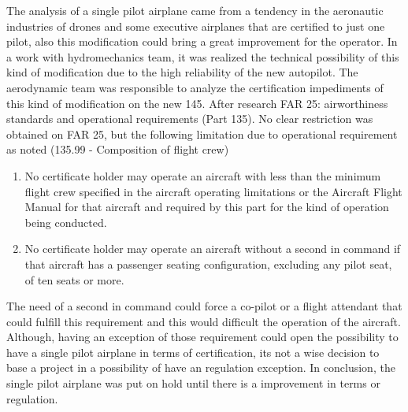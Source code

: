﻿The analysis of a single pilot airplane came from a tendency in the aeronautic industries of drones and some executive airplanes that are certified to just one pilot, also this modification could bring a great improvement for the operator.
	In a work with hydromechanics team, it was realized the technical possibility of this kind of modification due to the high reliability of the new autopilot. The aerodynamic team was responsible to analyze the certification impediments of this kind of modification on the new 145.
	After research FAR 25: airworthiness standards and operational requirements (Part 135). No clear restriction was obtained on FAR 25, but the following limitation due to operational requirement as noted (135.99 - Composition of flight crew)


\begin{enumerate}
  \item No certificate holder may operate an aircraft with less than the minimum flight crew specified in the aircraft operating limitations or the Aircraft Flight Manual for that aircraft and required by this part for the kind of operation being conducted.
  \item No certificate holder may operate an aircraft without a second in command if that aircraft has a passenger seating configuration, excluding any pilot seat, of ten seats or more.
\end{enumerate}


	The need of a second in command could force a co-pilot or a flight attendant that could fulfill this requirement and this would difficult the operation of the aircraft. Although, having an exception of those requirement could open the possibility to have a single pilot airplane in terms of certification, its not a wise decision to base a project in a possibility of have an regulation exception.
	In conclusion, the single pilot airplane was put on hold until there is a improvement in terms or regulation.
